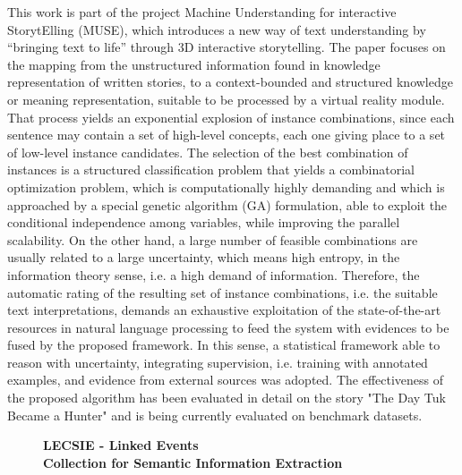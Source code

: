\documentclass[10pt, a4paper, twopage, headinclude, footinclude, BCOR5mm]{scrartcl}
\begin{document}
\noindent
This work is part of the project Machine Understanding for interactive StorytElling (MUSE), which introduces a new way of text understanding by “bringing text to life” through 3D interactive storytelling. The paper focuses on the mapping from the unstructured information found in knowledge representation of written stories, to a context-bounded and structured knowledge or meaning representation, suitable to be processed by a virtual reality module. That process yields an exponential explosion of instance combinations, since each sentence may contain a set of high-level concepts, each one giving place to a set of low-level instance candidates. The selection of the best combination of instances is a structured classification problem that yields a combinatorial optimization problem, which is computationally highly demanding and which is approached by a special genetic algorithm (GA) formulation, able to exploit the conditional independence among variables, while improving the parallel scalability. On the other hand, a large number of feasible combinations are usually related to a large uncertainty, which means high entropy, in the information theory sense, i.e. a high demand of information. Therefore, the automatic rating of the resulting set of instance combinations, i.e. the suitable text interpretations, demands an exhaustive exploitation of the state-of-the-art resources in natural language processing to feed the system with evidences to be fused by the proposed framework. In this sense, a statistical framework able to reason with uncertainty, integrating supervision, i.e. training with annotated examples, and evidence from external sources was adopted. The effectiveness of the proposed algorithm has been evaluated in detail on the story "The Day Tuk Became a Hunter" and is being currently evaluated on benchmark datasets.


\newpage

\begin{figure}[t!]
\centering
\large\textbf{LECSIE - Linked Events \\ Collection for Semantic Information Extraction}
\vspace*{0.5cm}
\end{figure}
\end{document}
